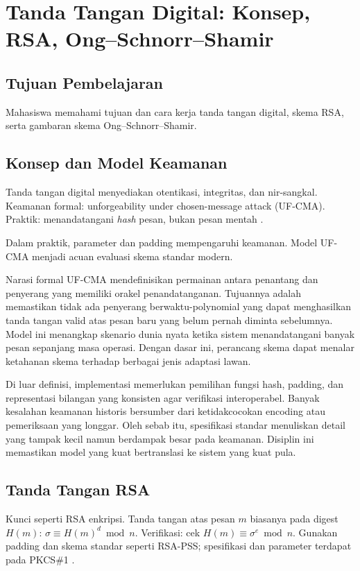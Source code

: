 \documentclass[../main.tex]{subfiles}
\begin{document}
\chapter{Tanda Tangan Digital: Konsep, RSA, Ong--Schnorr--Shamir}

\section{Tujuan Pembelajaran}
Mahasiswa memahami tujuan dan cara kerja tanda tangan digital, skema RSA, serta gambaran skema Ong--Schnorr--Shamir.

\section{Konsep dan Model Keamanan}
Tanda tangan digital menyediakan otentikasi, integritas, dan nir-sangkal. Keamanan formal: unforgeability under chosen-message attack (UF-CMA). Praktik: menandatangani \emph{hash} pesan, bukan pesan mentah \citep{katzlindell}.

Dalam praktik, parameter dan padding mempengaruhi keamanan. Model UF-CMA menjadi acuan evaluasi skema standar modern.

Narasi formal UF-CMA mendefinisikan permainan antara penantang dan penyerang yang memiliki orakel penandatanganan. Tujuannya adalah memastikan tidak ada penyerang berwaktu-polynomial yang dapat menghasilkan tanda tangan valid atas pesan baru yang belum pernah diminta sebelumnya. Model ini menangkap skenario dunia nyata ketika sistem menandatangani banyak pesan sepanjang masa operasi. Dengan dasar ini, perancang skema dapat menalar ketahanan skema terhadap berbagai jenis adaptasi lawan.

Di luar definisi, implementasi memerlukan pemilihan fungsi hash, padding, dan representasi bilangan yang konsisten agar verifikasi interoperabel. Banyak kesalahan keamanan historis bersumber dari ketidakcocokan encoding atau pemeriksaan yang longgar. Oleh sebab itu, spesifikasi standar menuliskan detail yang tampak kecil namun berdampak besar pada keamanan. Disiplin ini memastikan model yang kuat bertranslasi ke sistem yang kuat pula.

\section{Tanda Tangan RSA}
Kunci seperti RSA enkripsi. Tanda tangan atas pesan \(m\) biasanya pada digest \(H(m)\): \(\sigma\equiv H(m)^d\bmod n\). Verifikasi: cek \(H(m)\equiv \sigma^e\bmod n\). Gunakan padding dan skema standar seperti RSA-PSS; spesifikasi dan parameter terdapat pada PKCS\#1 \citep{katzlindell,stallings,rfc8017}.
\end{document}
